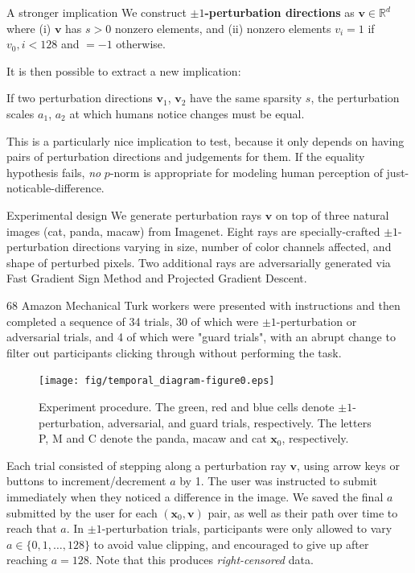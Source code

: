 \documentclass[final,notheorems]{beamer}
\newlength{\colwidth}
\def\bfx{\mathbf x}
\def\bfv{\mathbf v}
\def\R{\mathbb R}
\begin{document}
\begin{frame}[t]
\begin{columns}[t]
\begin{column}{\colwidth}
\begin{block}{A stronger implication}
    We construct \textbf{$\pm 1$-perturbation directions} as $\bfv\in\R^d$ where
    (i) $\bfv$ has $s>0$ nonzero elements, and
    (ii) nonzero elements $v_i = 1$ if $v_0,i < 128$ and $=-1$ otherwise.

    It is then possible to extract a new implication:

    \hspace*{.1\linewidth}\colorbox{highlightbg}{\begin{minipage}{.8\linewidth}
      If two perturbation directions $\bfv_1$, $\bfv_2$ have the same sparsity $s$, the perturbation scales $a_1$, $a_2$ at which humans notice changes must be equal.
    \end{minipage}}

    This is a particularly nice implication to test, because it only depends on having pairs of perturbation directions and judgements for them.
    If the equality hypothesis fails, \emph{no} $p$-norm is appropriate for modeling human perception of just-noticable-difference.
  \end{block}

  \begin{block}{Experimental design}
    We generate perturbation rays $\bfv$ on top of three natural images (cat, panda, macaw) from Imagenet.
    Eight rays are specially-crafted $\pm1$-perturbation directions varying in size, number of color channels affected, and shape of perturbed pixels.
    Two additional rays are adversarially generated via Fast Gradient Sign Method and Projected Gradient Descent.

    68 Amazon Mechanical Turk workers were presented with instructions and then completed a sequence of 34 trials, 30 of which were $\pm1$-perturbation or adversarial trials,
    and 4 of which were "guard trials", with an abrupt change to filter out participants clicking through without performing the task.

    \begin{figure}
      \centering
      \texttt{[image: fig/temporal\_diagram-figure0.eps]}
      \caption{Experiment procedure.
      The green, red and blue cells denote $\pm 1$-perturbation, adversarial, and guard trials, respectively.
      The letters P, M and C denote the panda, macaw and cat $\bfx_0$, respectively.
      }
      \label{fig:temporal}
    \end{figure}

    Each trial consisted of stepping along a perturbation ray $\bfv$, using arrow keys or buttons to increment/decrement $a$ by 1.
    The user was instructed to submit immediately when they noticed a difference in the image.
    We saved the final $a$ submitted by the user for each $(\bfx_0, \bfv)$ pair, as well as their path over time to reach that $a$.
    In $\pm1$-perturbation trials, participants were only allowed to vary $a\in\{0,1,\ldots,128\}$ to avoid value clipping, and encouraged to give up after reaching $a=128$.
    Note that this produces \emph{right-censored} data.


\end{block}
\end{column}
\end{columns}
\end{frame}
\end{document}
